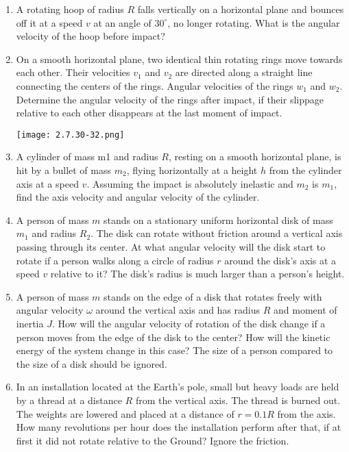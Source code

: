 \documentclass{article}
\begin{document}
\begin{enumerate}[label=2.7.\arabic*]
\item A rotating hoop of radius $R$ falls vertically on a horizontal plane and bounces off it at a speed $v$ at an angle of $30^\circ$, no longer rotating. What is the angular velocity of the hoop before impact?

\item On a smooth horizontal plane, two identical thin rotating rings move towards each other. Their velocities $v_1$ and $v_2$ are directed along a straight line connecting the centers of the rings. Angular velocities of the rings $w_1$ and $w_2$. Determine the angular velocity of the rings after impact, if their slippage relative to each other disappears at the last moment of impact.

\begin{center}
    \texttt{[image: 2.7.30-32.png]}
\end{center}

\item A cylinder of mass m1 and radius $R$, resting on a smooth horizontal plane, is hit by a bullet of mass $m_2$, flying horizontally at a height $h$ from the cylinder axis at a speed $v$. Assuming the impact is absolutely inelastic and $m_2$ is $m_1$, find the axis velocity and angular velocity of the cylinder.

\item A person of mass $m$ stands on a stationary uniform horizontal disk of mass $m_1$ and radius $R_2$. The disk can rotate without friction around a vertical axis passing through its center. At what angular velocity will the disk start to rotate if a person walks along a circle of radius $r$ around the disk's axis at a speed $v$ relative to it? The disk's radius is much larger than a person's height.

\item A person of mass $m$ stands on the edge of a disk that rotates freely with angular velocity $\omega$ around the vertical axis and has radius $R$ and moment of inertia $J$. How will the angular velocity of rotation of the disk change if a person moves from the edge of the disk to the center? How will the kinetic energy of the system change in this case? The size of a person compared to the size of a disk should be ignored.

\item In an installation located at the Earth's pole, small but heavy loads are held by a thread at a distance $R$ from the vertical axis. The thread is burned out. The weights are lowered and placed at a distance of $r = 0.1 R$ from the axis. How many revolutions per hour does the installation perform after that, if at first it did not rotate relative to the Ground? Ignore the friction.


\end{enumerate}
\end{document}
